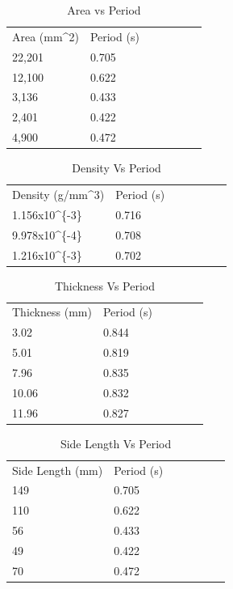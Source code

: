 \documentclass[12pt]{article}
\begin{document}
\begin{multicols}{2}
\begin{table}[H]
\centering
\caption{Area vs Period}
\label{Area vs Period}
\begin{tabular}{lllllll}
Area (mm\textasciicircum 2) & Period (s) \\
22,201                      & 0.705                     \\
12,100                      & 0.622                     \\
3,136                       & 0.433                     \\
2,401                       & 0.422                     \\
4,900                       & 0.472                    
\end{tabular}
\end{table}

\begin{table}[H]
\centering
\caption{Density Vs Period}
\label{Density Vs Period}
\begin{tabular}{lllllll}
Density (g/mm\textasciicircum 3) & Period (s) \\
1.156x10\textasciicircum \{-3\}  & 0.716      \\
9.978x10\textasciicircum \{-4\}  & 0.708      \\
1.216x10\textasciicircum \{-3\}  & 0.702     
\end{tabular}
\end{table}

\begin{table}[H]
\centering
\caption{Thickness Vs Period}
\label{Thickness Vs Period}
\begin{tabular}{llllll}
Thickness (mm) & Period (s) \\
3.02           & 0.844      \\
5.01           & 0.819      \\
7.96           & 0.835      \\
10.06          & 0.832      \\
11.96          & 0.827     
\end{tabular}
\end{table}

\begin{table}[H]
\centering
\caption{Side Length Vs Period}
\label{Side Length Vs Period}
\begin{tabular}{lllllll}
Side Length (mm) & Period (s) \\
149              & 0.705                     \\
110              & 0.622                     \\
56               & 0.433                     \\
49               & 0.422                     \\
70               & 0.472                    
\end{tabular}
\end{table}
\end{multicols}
\end{document}
